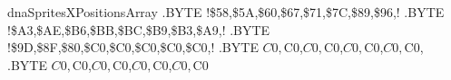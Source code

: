 dnaSpritesXPositionsArray
.BYTE !\colorbox{blue!35}{\$58,\$5A,\$60,\$67,\$71,\$7C,\$89,\$96,}!
.BYTE !\colorbox{blue!35}{\$A3,\$AE,\$B6,\$BB,\$BC,\$B9,\$B3,\$A9,}!
.BYTE !\colorbox{blue!35}{\$9D,\$8F,\$80,\$C0,\$C0,\$C0,\$C0,\$C0,}!
.BYTE $C0,$C0,$C0,$C0,$C0,$C0,$C0,$C0,
.BYTE $C0,$C0,$C0,$C0,$C0,$C0,$C0,$C0

